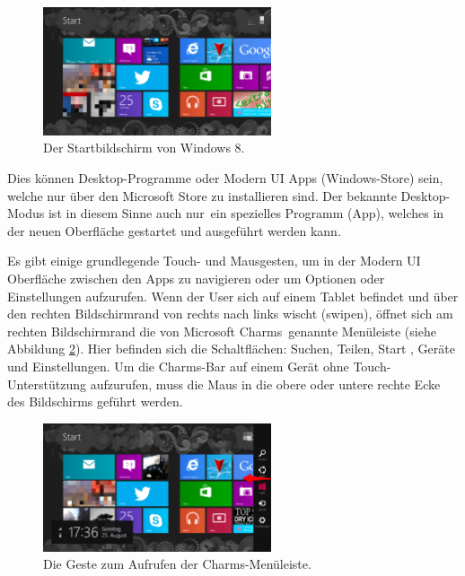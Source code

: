 \documentclass[12pt,a4paper,bibtotoc,abstracton]{scrartcl}
\begin{document}
\begin{figure}[h]	
	\centering
	\includegraphics[width=0.6\textwidth]{Bilder/Screenshots/windows8/win8_startscreen.png} 
	\caption{Der Startbildschirm von Windows 8.}
	\label{fig:win8startscreen}
\end{figure}

Dies können Desktop-Programme oder Modern UI Apps (Windows-Store) sein, welche nur über den Microsoft Store zu installieren sind. Der bekannte Desktop-Modus ist in diesem Sinne auch \glqq nur\grqq\ ein spezielles Programm (App), welches in der neuen Oberfläche gestartet und ausgeführt werden kann.

Es gibt einige grundlegende Touch- und Mausgesten, um in der Modern UI Oberfläche zwischen den Apps zu navigieren oder um Optionen oder Einstellungen aufzurufen. Wenn der User sich auf einem Tablet befindet und über den rechten Bildschirmrand von rechts nach links wischt (swipen), öffnet sich am rechten Bildschirmrand die von Microsoft \glqq Charms\grqq\ genannte Menüleiste (siehe Abbildung \ref{fig:charms}). Hier befinden sich die Schaltflächen: Suchen, Teilen, Start , Geräte und Einstellungen. Um die Charms-Bar auf einem Gerät ohne Touch-Unterstützung aufzurufen, muss die Maus in die obere oder untere rechte Ecke des Bildschirms geführt werden. 

\begin{figure}[h]	
	\centering
	\includegraphics[width=0.6\textwidth]{Bilder/Screenshots/windows8/charm_bar.png} 
	\caption{Die Geste zum Aufrufen der Charms-Menüleiste.}
	\label{fig:charms}
\end{figure}  
\end{document}
